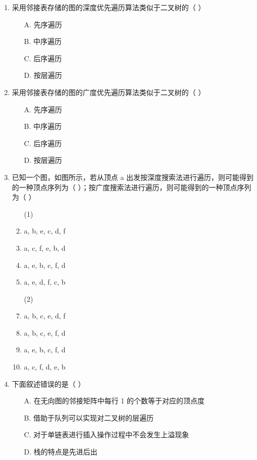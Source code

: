 \documentclass[12pt, a4paper]{article}
\begin{document}
\begin{enumerate}[label=\arabic*.]
	\item 采用邻接表存储的图的深度优先遍历算法类似于二叉树的（ ）
	      \begin{enumerate}
		      \item[A.] 先序遍历
		      \item[B.] 中序遍历
		      \item[C.] 后序遍历
		      \item[D.] 按层遍历
	      \end{enumerate}

	\item 采用邻接表存储的图的广度优先遍历算法类似于二叉树的（ ）
	      \begin{enumerate}
		      \item[A.] 先序遍历
		      \item[B.] 中序遍历
		      \item[C.] 后序遍历
		      \item[D.] 按层遍历
	      \end{enumerate}

	\item 已知一个图，如图所示，若从顶点 a 出发按深度搜索法进行遍历，则可能得到的一种顶点序列为（ ）；按广度搜索法进行遍历，则可能得到的一种顶点序列为（ ）
	      \begin{enumerate}
		      \item[(1)]
		      \item a, b, e, c, d, f
		      \item a, c, f, e, b, d
		      \item a, e, b, c, f, d
		      \item a, e, d, f, c, b
		      \item[(2)]
		      \item a, b, c, e, d, f
		      \item a, b, c, e, f, d
		      \item a, e, b, c, f, d
		      \item a, c, f, d, e, b
	      \end{enumerate}

	\item 下面叙述错误的是（ ）
	      \begin{enumerate}
		      \item[A.] 在无向图的邻接矩阵中每行 1 的个数等于对应的顶点度
		      \item[B.] 借助于队列可以实现对二叉树的层遍历
		      \item[C.] 对于单链表进行插入操作过程中不会发生上溢现象
		      \item[D.] 栈的特点是先进后出
	      \end{enumerate}


\end{enumerate}
\end{document}
